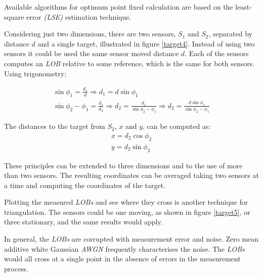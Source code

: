 \documentclass[english,purist]{ist-report}
\begin{document}
Available algorithms for optimum point fixed calculation are based on the least-square error \textit{(LSE)} estimation technique.

Considering just two dimensions, there are two sensors, $S_1$ and $S_2$, separated by distance $d$ and a single target, illustrated in figure \ref{target4}. Instead of using two sensors it could be used the same sensor moved distance $d$. Each of the sensors computes an \textit{LOB} relative to some reference, which is the same for both sensors. Using trigonometry: 

\begin{gather*}
    \sin{\phi_1} = \frac{d_1}{d} \Rightarrow 
    d_1 = d \sin{\phi_1} \\
\sin{\phi_2 - \phi_1} = \frac{d_1}{d_2} \Rightarrow d_2 = \frac{d_1}{\sin{\phi_2 - \phi_1}} \Rightarrow d_2 = \frac{d \sin{\phi_1}}{\sin{\phi_2 - \phi_1}}     
\end{gather*}

The distances to the target from $S_2$, $x$ and $y$, can be computed as:
\begin{gather*}
    x = d_2 \cos{\phi_2} \\
    y = d_2 \sin{\phi_2}
\end{gather*}

These principles can be extended to three dimensions and to the use of more than two sensors. The resulting coordinates can be averaged taking two sensors at a time and computing the coordinates of the target.

Plotting the measured \textit{LOBs} and see where they cross is another technique for triangulation. The sensors could be one moving, as shown in figure \ref{target5}, or three stationary, and the same results would apply.

In general, the \textit{LOBs} are corrupted with measurement error and noise. Zero mean additive white Gaussian \textit{AWGN} frequently characterises the noise. The \textit{LOBs} would all cross at a single point in the absence of errors in the measurement process. 
\end{document}
